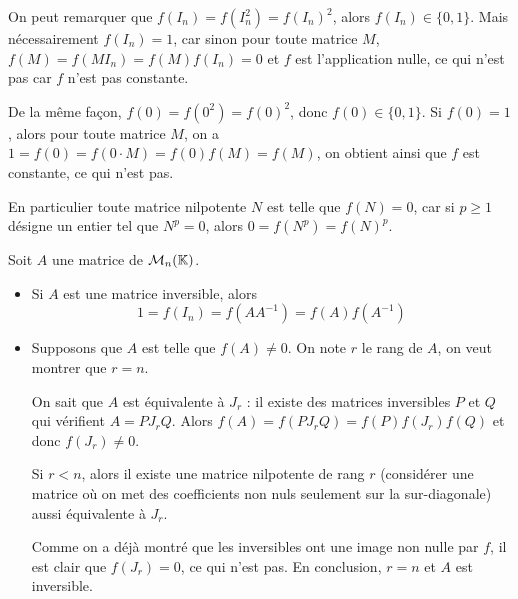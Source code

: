 \begin{solution}
    On peut remarquer que $f(I_n) = f(I_n^2) = f(I_n)^2$, alors $f(I_n)\in\lbrace0,1\rbrace$.
    Mais nécessairement $f(I_n) = 1$, car sinon pour toute matrice $M$, $f(M) = f(MI_n)= f(M)f(I_n) = 0$
    et $f$ est l'application nulle, ce qui n'est pas car $f$ n'est pas constante.

    De la même façon, $f(0) = f(0^2) = f(0)^2$, donc $f(0)\in\lbrace0,1\rbrace$. 
    Si $f(0) = 1$, alors pour toute matrice $M$, on a $1=f(0)=f(0\cdot M)=f(0)f(M)=f(M)$, 
    on obtient ainsi que $f$ est constante, ce qui n'est pas. 

    En particulier toute matrice nilpotente $N$ est telle que $f(N)=0$, car si $p\geq 1$
    désigne un entier tel que $N^p=0$, alors $0=f(N^p)=f(N)^p$.

    Soit $A$ une matrice de $\mathcal M_n(\operatorname{\mathbb K})$.
    \begin{itemize}
        \item[\boxed{\Leftarrow}] Si $A$ est une matrice inversible, alors  
        \[1=f(I_n)=f(AA^{-1})=f(A)f(A^{-1})\]
        \item[\boxed{\Rightarrow}] Supposons que $A$ est telle que $f(A)\neq 0$.
        On note $r$ le rang de $A$, on veut montrer que $r=n$.

        On sait que $A$ est équivalente à $J_r$ : il existe des matrices inversibles $P$ et $Q$
        qui vérifient $A = PJ_r Q$. 
        Alors $f(A) = f(P J_r Q) = f(P)f(J_r)f(Q)$ et donc $f(J_r)\neq0$.
        
        Si $r<n$, alors il existe une matrice nilpotente de rang $r$ (considérer une matrice où on met des coefficients non nuls seulement sur la sur-diagonale)
        aussi équivalente à $J_r$. 

        Comme on a déjà montré que les inversibles ont une image non nulle par $f$, il est clair que $f(J_r)=0$, ce qui n'est pas.
        En conclusion, $r=n$ et $A$ est inversible.
    \end{itemize}
\end{solution}